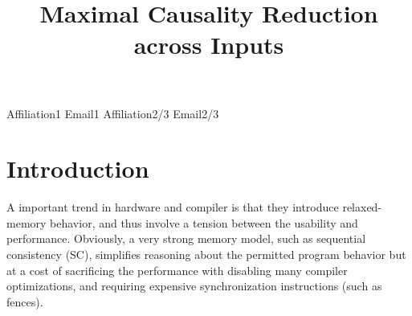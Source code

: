 \documentclass[preprint, numbers, 10pt]{sigplanconf}
\begin{document}
\setlength{\pdfpageheight}{\paperheight}
\setlength{\pdfpagewidth}{\paperwidth}




\title{Maximal Causality Reduction across Inputs}

           {Affiliation1}
           {Email1}
           {Affiliation2/3}
           {Email2/3}

\maketitle

\begin{abstract}

\end{abstract}




%
%
%
%
%
%

\section{Introduction}

A important trend in hardware and compiler is that 
they introduce relaxed-memory behavior, and thus involve 
a tension between the usability and performance. 
Obviously, a very strong memory model, such as sequential 
consistency (SC), simplifies reasoning about the permitted 
program behavior but at a cost of sacrificing the performance 
with disabling many compiler optimizations, and requiring
expensive synchronization instructions (such as fences). 
\end{document}

